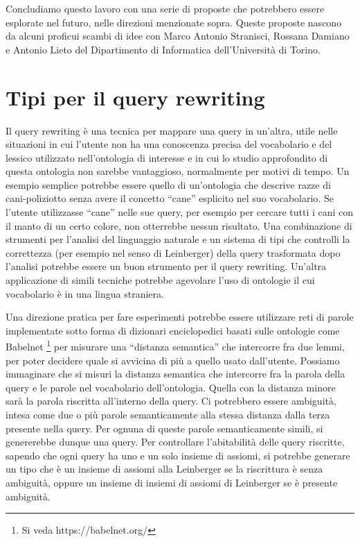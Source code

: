 Concludiamo questo lavoro con una serie di proposte che potrebbero essere esplorate nel futuro, nelle direzioni menzionate sopra. Queste proposte 
nascono da alcuni proficui scambi di idee con Marco Antonio Stranisci, Rossana Damiano e Antonio Lieto del Dipartimento di Informatica dell'Università 
di Torino.

\section{Tipi per il query rewriting}
Il query rewriting è una tecnica per mappare una query in un'altra, utile nelle situazioni in cui l'utente non ha una conoscenza precisa del vocabolario e 
del lessico utilizzato nell'ontologia di interesse e in cui lo studio approfondito di questa ontologia non sarebbe vantaggioso, normalmente per motivi di tempo. Un 
esempio semplice potrebbe essere quello di un'ontologia che descrive razze di cani-poliziotto senza avere il concetto “cane” esplicito nel suo vocabolario. 
Se l'utente utilizzasse “cane” nelle sue query, per esempio per cercare tutti i cani con il manto di un certo colore, non otterrebbe nessun risultato. Una 
combinazione di strumenti per l'analisi del linguaggio naturale e un sistema di tipi che controlli la correttezza (per esempio nel senso di Leinberger) 
della query trasformata dopo l'analisi potrebbe essere un buon strumento per il query rewriting. Un'altra applicazione di simili tecniche potrebbe agevolare 
l'uso di ontologie il cui vocabolario è in una lingua straniera.

Una direzione pratica per fare esperimenti potrebbe essere utilizzare reti di parole implementate sotto forma di dizionari enciclopedici 
basati sulle ontologie come Babelnet \footnote{Si veda https://babelnet.org/} per misurare una “distanza semantica”  che intercorre fra due lemmi, per poter 
decidere quale si avvicina di più a quello usato dall'utente. Possiamo immaginare che si misuri la distanza semantica che intercorre fra la parola della 
query e le parole nel vocabolario dell'ontologia. Quella con la distanza minore sarà la parola riscritta all'interno della query. Ci potrebbero essere 
ambiguità, intesa come due o più parole semanticamente alla stessa distanza dalla terza presente nella query. Per ognuna di queste parole semanticamente 
simili, si genererebbe dunque una query.
Per controllare l'abitabilità delle query riscritte, sapendo che ogni query ha uno e un solo insieme di assiomi, si potrebbe generare un tipo che è un 
insieme di assiomi alla Leinberger se la riscrittura è senza ambiguità, oppure un insieme di insiemi di assiomi di Leinberger se è presente ambiguità.

